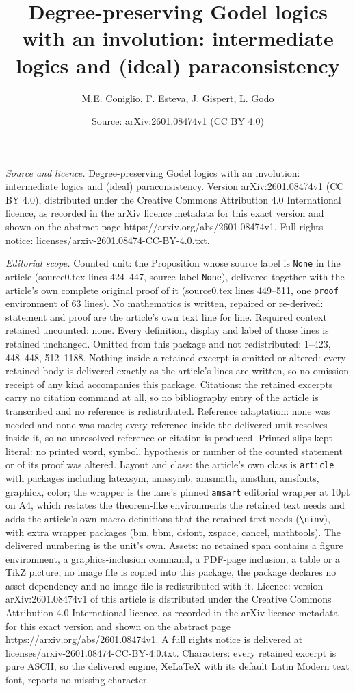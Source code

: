 \documentclass[10pt,a4paper]{amsart}
\title[Degree-preserving Godel logics with an involution: intermedi]{Degree-preserving Godel logics with an involution: intermediate logics and (ideal) paraconsistency}
\author{M.E. Coniglio, F. Esteva, J. Gispert, L. Godo}
\date{Source: arXiv:2601.08474v1 (CC BY 4.0)}
\begin{document}
\maketitle

\noindent\emph{Source and licence.} Degree-preserving Godel logics with an involution: intermediate logics and (ideal) paraconsistency. Version arXiv:2601.08474v1 (CC BY 4.0), distributed under the Creative Commons Attribution 4.0 International licence, as recorded in the arXiv licence metadata for this exact version and shown on the abstract page https://arxiv.org/abs/2601.08474v1. Full rights notice: licenses/arxiv-2601.08474-CC-BY-4.0.txt.\par\smallskip

\noindent\textit{Editorial scope.} Counted unit: the Proposition whose source label is \texttt{None} in the article (source0.tex lines 424--447, source label \texttt{None}), delivered together with the article's own complete original proof of it (source0.tex lines 449--511, one \texttt{proof} environment of 63 lines). No mathematics is written, repaired or re-derived: statement and proof are the article's own text line for line. Required context retained uncounted: none. Every definition, display and label of those lines is retained unchanged. Omitted from this package and not redistributed: 1--423, 448--448, 512--1188. Nothing inside a retained excerpt is omitted or altered: every retained body is delivered exactly as the article's lines are written, so no omission receipt of any kind accompanies this package. Citations: the retained excerpts carry no citation command at all, so no bibliography entry of the article is transcribed and no reference is redistributed. Reference adaptation: none was needed and none was made; every reference inside the delivered unit resolves inside it, so no unresolved reference or citation is produced. Printed slips kept literal: no printed word, symbol, hypothesis or number of the counted statement or of its proof was altered. Layout and class: the article's own class is \texttt{article} with packages including latexsym, amssymb, amsmath, amsthm, amsfonts, graphicx, color; the wrapper is the lane's pinned \texttt{amsart} editorial wrapper at 10pt on A4, which restates the theorem-like environments the retained text needs and adds the article's own macro definitions that the retained text needs (\texttt{\textbackslash ninv}), with extra wrapper packages (bm, bbm, dsfont, xspace, cancel, mathtools). The delivered numbering is the unit's own. Assets: no retained span contains a figure environment, a graphics-inclusion command, a PDF-page inclusion, a table or a TikZ picture; no image file is copied into this package, the package declares no asset dependency and no image file is redistributed with it. Licence: version arXiv:2601.08474v1 of this article is distributed under the Creative Commons Attribution 4.0 International licence, as recorded in the arXiv licence metadata for this exact version and shown on the abstract page https://arxiv.org/abs/2601.08474v1. A full rights notice is delivered at licenses/arxiv-2601.08474-CC-BY-4.0.txt. Characters: every retained excerpt is pure ASCII, so the delivered engine, XeLaTeX with its default Latin Modern text font, reports no missing character.
\end{document}
